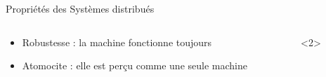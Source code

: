 \documentclass[presentation]{beamer}
\begin{document}
\begin{frame}[label={sec:org969e7f9}]{Propriétés des Systèmes distribués}
\begin{columns}
\begin{column}{0.46\columnwidth}
\begin{block}{}
\begin{itemize}
\item <1-> \alert{Robustesse} :  la machine fonctionne toujours
\item <2> \alert{Atomocite} : elle est perçu comme une seule machine
\end{itemize}
\end{block}
\end{column}

\begin{column}{0.46\columnwidth}
\begin{block}<2>{}


\end{block}
\end{column}
\end{columns}
\end{frame}
\end{document}
